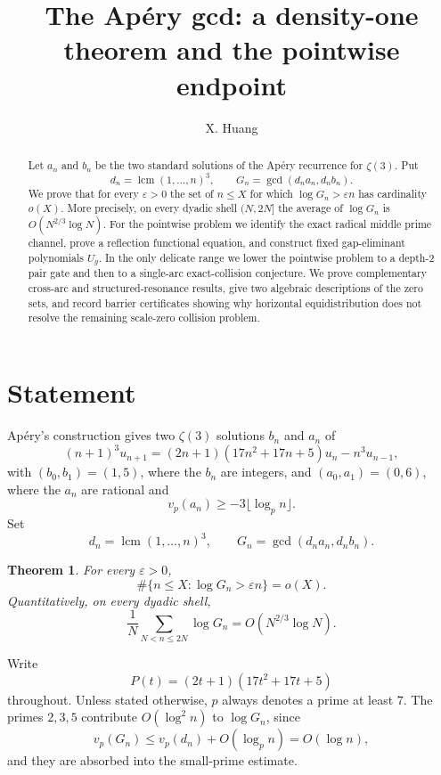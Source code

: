 \documentclass[11pt]{amsart}
\title{The Ap\'ery gcd: a density-one theorem and the pointwise endpoint}
\author{X. Huang}
\date{}
\DeclareMathOperator{\lcm}{lcm}
\theoremstyle{plain}
\newtheorem{theorem}{Theorem}
\theoremstyle{remark}
\begin{document}
\raggedbottom

\begin{abstract}
Let $a_n$ and $b_n$ be the two standard solutions of the Ap\'ery
recurrence for $\zeta(3)$.  Put
\[
 d_n=\lcm(1,\ldots,n)^3,
 \qquad G_n=\gcd(d_na_n,d_nb_n).
\]
We prove that for every $\varepsilon>0$ the set of $n\leq X$ for which
$\log G_n>\varepsilon n$ has cardinality $o(X)$.
More precisely, on every dyadic shell $(N,2N]$ the average of
$\log G_n$ is $O(N^{2/3}\log N)$.  For the pointwise problem we
identify the exact radical middle prime channel, prove a reflection
functional equation, and construct fixed gap-eliminant polynomials
$U_g$.  In the only delicate range we lower the pointwise problem to a
depth-$2$ pair gate and then to a single-arc exact-collision conjecture.
We prove complementary cross-arc and structured-resonance results, give
two algebraic descriptions of the zero sets, and record barrier
certificates showing why horizontal equidistribution does not resolve
the remaining scale-zero collision problem.
\end{abstract}

\maketitle

\section{Statement}

Ap\'ery's construction \cite{Apery1979} gives two $\zeta(3)$ solutions
$b_n$ and $a_n$ of
\[
 (n+1)^3u_{n+1}
 = (2n+1)(17n^2+17n+5)u_n-n^3u_{n-1},
\]
with $(b_0,b_1)=(1,5)$, where the $b_n$ are integers, and
$(a_0,a_1)=(0,6)$, where the $a_n$ are rational and
\[
 v_p(a_n)\geq -3\lfloor\log_p n\rfloor.
\]
Set
\[
 d_n=\lcm(1,\ldots,n)^3,
 \qquad
 G_n=\gcd(d_na_n,d_nb_n).
\]

\begin{theorem}\label{thm:density-one}
For every $\varepsilon>0$,
\[
 \#\{n\leq X:\log G_n>\varepsilon n\}=o(X).
\]
Quantitatively, on every dyadic shell,
\[
 \frac1N\sum_{N<n\leq2N}\log G_n=O(N^{2/3}\log N).
\]
\end{theorem}

Write
\[
 P(t)=(2t+1)(17t^2+17t+5)
\]
throughout.  Unless stated otherwise, $p$ always denotes a prime at least
$7$.  The primes $2,3,5$ contribute $O(\log^2 n)$ to $\log G_n$, since
\[
 v_p(G_n)\leq v_p(d_n)+O(\log_p n)=O(\log n),
\]
and they are absorbed into the small-prime estimate.
\end{document}
